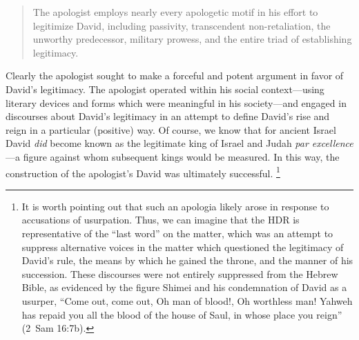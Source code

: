 \begin{quote}
    The apologist employs nearly every apologetic motif in his effort to legitimize David, including passivity, transcendent non-retaliation, the unworthy predecessor, military prowess, and the entire triad of establishing legitimacy.%
    \autocite{knapp2015}
\end{quote}

Clearly the apologist sought to make a forceful and potent argument in favor of David's legitimacy. The apologist operated within his social context---using literary devices and forms which were meaningful in his society---and engaged in discourses about David's legitimacy in an attempt to define David's rise and reign in a particular (positive) way. Of course, we know that for ancient Israel David \emph{did} become known as the legitimate king of Israel and Judah \emph{par excellence}---a figure against whom subsequent kings would be measured. In this way, the construction of the apologist's David was ultimately successful.%
    \footnote{It is worth pointing out that such an apologia likely arose in response to accusations of usurpation. Thus, we can imagine that the HDR is representative of the ``last word'' on the matter, which was an attempt to suppress alternative voices in the matter which questioned the legitimacy of David's rule, the means by which he gained the throne, and the manner of his succession. These discourses were not entirely suppressed from the Hebrew Bible, as evidenced by the figure Shimei and his condemnation of David as a usurper, ``Come out, come out, Oh man of blood!, Oh worthless man! Yahweh has repaid you all the blood of the house of Saul, in whose place you reign'' (2~Sam 16:7b).}


